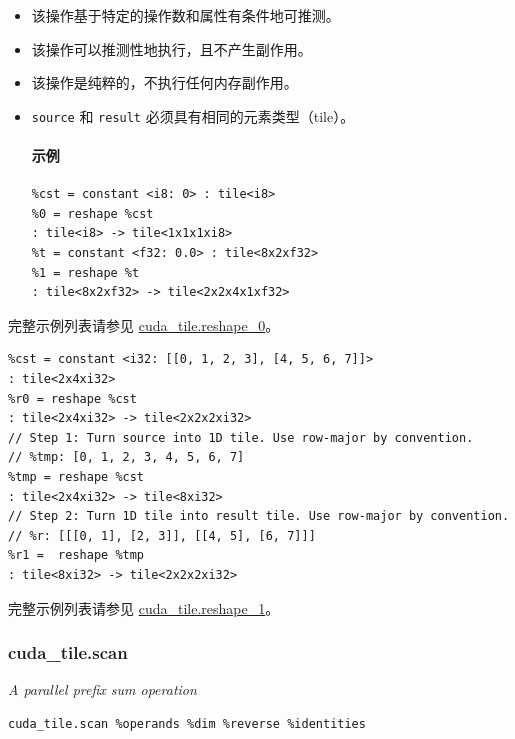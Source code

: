 \documentclass{article}
\begin{document}
\begin{itemize}
\item 该操作基于特定的操作数和属性有条件地可推测。
\item 该操作可以推测性地执行，且不产生副作用。
\item 该操作是纯粹的，不执行任何内存副作用。
\item \texttt{source} 和 \texttt{result} 必须具有相同的元素类型（tile）。


\paragraph{示例}

\begin{lstlisting}
%cst = constant <i8: 0> : tile<i8>
%0 = reshape %cst
: tile<i8> -> tile<1x1x1xi8>
%t = constant <f32: 0.0> : tile<8x2xf32>
%1 = reshape %t
: tile<8x2xf32> -> tile<2x2x4x1xf32>
\end{lstlisting}

\end{itemize}
完整示例列表请参见 \href{https://docs.nvidia.com/cuda/tile-ir/latest/sections/appendix.html#example-cuda-tile-reshape-0}{cuda\_tile.reshape\_0}。


\begin{lstlisting}
%cst = constant <i32: [[0, 1, 2, 3], [4, 5, 6, 7]]>
: tile<2x4xi32>
%r0 = reshape %cst
: tile<2x4xi32> -> tile<2x2x2xi32>
// Step 1: Turn source into 1D tile. Use row-major by convention.
// %tmp: [0, 1, 2, 3, 4, 5, 6, 7]
%tmp = reshape %cst
: tile<2x4xi32> -> tile<8xi32>
// Step 2: Turn 1D tile into result tile. Use row-major by convention.
// %r: [[[0, 1], [2, 3]], [[4, 5], [6, 7]]]
%r1 =  reshape %tmp
: tile<8xi32> -> tile<2x2x2xi32>
\end{lstlisting}

完整示例列表请参见 \href{https://docs.nvidia.com/cuda/tile-ir/latest/sections/appendix.html#example-cuda-tile-reshape-1}{cuda\_tile.reshape\_1}。



\subsubsection{cuda\_tile.scan}

\textit{A parallel prefix sum operation}


\begin{lstlisting}
cuda_tile.scan %operands %dim %reverse %identities
\end{lstlisting}
\end{document}
